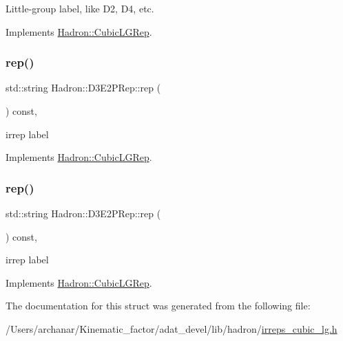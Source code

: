 Little-\/group label, like D2, D4, etc. 

Implements \mbox{\hyperlink{structHadron_1_1CubicLGRep_a9bdb14b519a611d21379ed96a3a9eb41}{Hadron\+::\+Cubic\+L\+G\+Rep}}.

\mbox{\label{structHadron_1_1D3E2PRep_aac98f22bbc3837857380501e2fd81b44}} 
\subsubsection{\texorpdfstring{rep()}{rep()}\hspace{0.1cm}{\footnotesize\ttfamily [1/2]}}
{\footnotesize\ttfamily std\+::string Hadron\+::\+D3\+E2\+P\+Rep\+::rep (\begin{DoxyParamCaption}{ }\end{DoxyParamCaption}) const\hspace{0.3cm}{\ttfamily [inline]}, {\ttfamily [virtual]}}

irrep label 

Implements \mbox{\hyperlink{structHadron_1_1CubicLGRep_a50f5ddbb8f4be4cee0106fa9e8c75e6c}{Hadron\+::\+Cubic\+L\+G\+Rep}}.

\mbox{\label{structHadron_1_1D3E2PRep_aac98f22bbc3837857380501e2fd81b44}} 
\subsubsection{\texorpdfstring{rep()}{rep()}\hspace{0.1cm}{\footnotesize\ttfamily [2/2]}}
{\footnotesize\ttfamily std\+::string Hadron\+::\+D3\+E2\+P\+Rep\+::rep (\begin{DoxyParamCaption}{ }\end{DoxyParamCaption}) const\hspace{0.3cm}{\ttfamily [inline]}, {\ttfamily [virtual]}}

irrep label 

Implements \mbox{\hyperlink{structHadron_1_1CubicLGRep_a50f5ddbb8f4be4cee0106fa9e8c75e6c}{Hadron\+::\+Cubic\+L\+G\+Rep}}.



The documentation for this struct was generated from the following file\+:\begin{DoxyCompactItemize}
\item 
/\+Users/archanar/\+Kinematic\+\_\+factor/adat\+\_\+devel/lib/hadron/\mbox{\hyperlink{lib_2hadron_2irreps__cubic__lg_8h}{irreps\+\_\+cubic\+\_\+lg.\+h}}\end{DoxyCompactItemize}

